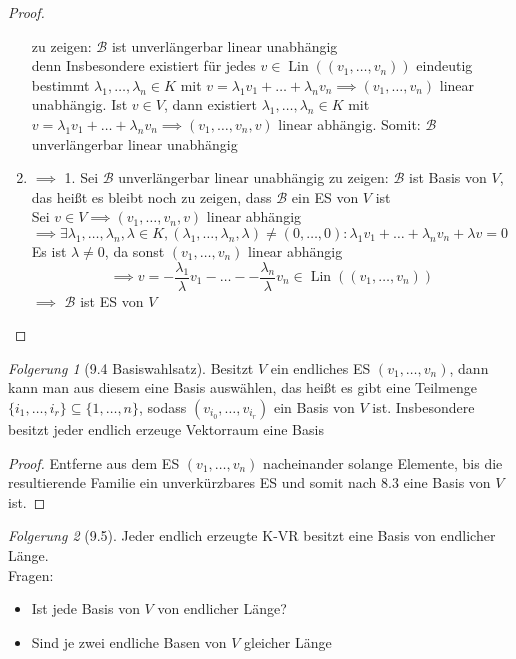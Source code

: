 \documentclass[a4paper]{scrartcl}
\DeclareMathOperator{\Exists}{\exists}
\DeclareMathOperator{\Lin}{Lin}
\theoremstyle{definition}
\theoremstyle{plain}
\theoremstyle{plain}
\theoremstyle{remark}
\theoremstyle{remark}
\theoremstyle{remark}
\newtheorem{conc}{Folgerung}
\theoremstyle{remark}
\theoremstyle{remark}
\begin{document}
\begin{proof}
\begin{enumerate}
     zu zeigen: $\mathcal{B}$ ist unverlängerbar linear unabhängig \\
     denn Insbesondere existiert für jedes $v\in \Lin((v_1, \ldots, v_n))$ eindeutig bestimmt $\lambda_1, \ldots, \lambda_n \in K$ mit $v = \lambda_1 v_1 + \ldots + \lambda_n v_n \implies (v_1,\ldots, v_n)$ linear unabhängig.
Ist $v\in V$, dann existiert $\lambda_1, \ldots, \lambda_n \in K$ mit $v = \lambda_1 v_1 + \ldots + \lambda_n v_n \implies (v_1, \ldots, v_n, v)$ linear abhängig. Somit: $\mathcal{B}$ unverlängerbar linear unabhängig
\item $\implies$ 1. Sei $\mathcal{B}$ unverlängerbar linear unabhängig
zu zeigen: $\mathcal{B}$ ist Basis von $V$, das heißt es bleibt noch zu zeigen, dass $\mathcal{B}$ ein ES von $V$ ist \\
     Sei $v\in V \implies (v_1, \ldots, v_n, v)$ linear abhängig $\implies \Exists \lambda_1, \ldots, \lambda_n, \lambda \in K, (\lambda_1, \ldots, \lambda_n, \lambda) \neq (0, \ldots, 0): \lambda_1 v_1 + \ldots + \lambda_n v_n + \lambda v = 0$
Es ist $\lambda \neq 0$, da sonst $(v_1, \ldots, v_n)$ linear abhängig
\[\implies v = -\frac{\lambda_1}{\lambda} v_1 - \ldots - -\frac{\lambda_n}{\lambda} v_n \in \Lin((v_1, \ldots, v_n))\]
$\implies$ $\mathcal{B}$ ist ES von $V$
\end{enumerate}
\end{proof}
\begin{conc}[9.4 Basiswahlsatz]
Besitzt $V$ ein endliches ES $(v_1, \ldots, v_n)$, dann kann man aus diesem eine Basis auswählen, das heißt es gibt eine Teilmenge $\{i_1, \ldots, i_r\} \subseteq \{1, \ldots, n\}$, sodass $(v_{i_0}, \ldots, v_{i_r})$ ein Basis von $V$ ist. Insbesondere besitzt jeder endlich erzeuge Vektorraum eine Basis
\end{conc}
\begin{proof}
Entferne aus dem ES $(v_1, \ldots, v_n)$ nacheinander solange Elemente, bis die resultierende Familie ein unverkürzbares ES und somit nach 8.3 eine Basis von $V$ ist.
\end{proof}
\begin{conc}[9.5]
Jeder endlich erzeugte K-VR besitzt eine Basis von endlicher Länge. \\
  Fragen:
\begin{itemize}
\item Ist jede Basis von $V$ von endlicher Länge?
\item Sind je zwei endliche Basen von $V$ gleicher Länge
\end{itemize}
\end{conc}
\end{document}
